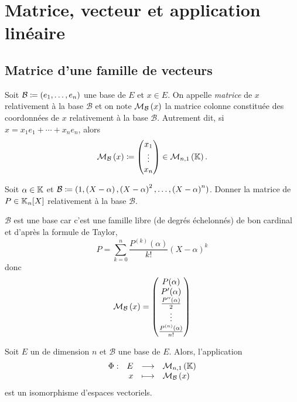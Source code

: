 \documentclass{magnolia}
\begin{document}
\magtoc

\section{Matrice, vecteur et application linéaire}
\subsection{Matrice d'une famille de vecteurs}

\begin{definition}[utile=-3]
Soit $\mathcal{B}\coloneqq(e_1,\ldots,e_n)$ une base de $E$ et $x\in E$.
On appelle \emph{matrice} de $x$ relativement à la base $\mathcal{B}$ et on note
$\mathcal{M}_{\mathcal{B}}\left(x\right)$ la matrice colonne constituée des coordonnées de $x$
relativement à la base $\mathcal{B}$. Autrement dit,
si $x=x_1 e_1+\cdots+x_n e_n$, alors
\[\mathcal{M}_{\mathcal{B}}\left(x\right)\coloneqq
  \begin{pmatrix}
  x_1\\ \vdots\\ x_n
  \end{pmatrix}\in\mathcal{M}_{n,1}\left(\mathbb{K}\right).\]
\end{definition}

\begin{exoUnique}
\exo Soit $\alpha\in\mathbb{K}$ et
  $\mathcal{B}\coloneqq(1,\left(X-\alpha\right),\left(X-\alpha\right)^2,\ldots,\left(X-\alpha\right)^n)$. Donner
  la matrice de $P\in\polyK[n]$ relativement à la base $\mathcal{B}$.
  \begin{sol}
  $\mathcal{B}$ est une base car c'est une famille libre (de degrés échelonnés) de bon cardinal et d'après la formule de Taylor, $$P=\sum_{k=0}^n\frac{P^{(k)}(\alpha)}{k!}(X-\alpha)^k$$ donc \[\mathcal{M}_{\mathcal{B}}\left(x\right)=
  \begin{pmatrix}
  P(\alpha)\\P'(\alpha)\\\frac{P''(\alpha)}{2}\\ \vdots\\ \frac{P^{(n)}(\alpha)}{n!}
  \end{pmatrix}\]
  \end{sol}
\end{exoUnique}

\begin{proposition}[utile=-3]
Soit $E$ un \Kev de dimension $n$ et $\mathcal{B}$ une base de $E$.
Alors, l'application
\[\begin{array}[t]{lrcl} \displaystyle{\Phi} : & \displaystyle{E} & \longrightarrow & \displaystyle{\mathcal{M}_{n,1}\left(\ensuremath{\mathbb{K}}\right)} \\ & \displaystyle{x} & \longmapsto & \displaystyle{\mathcal{M}_{\mathcal{B}}\left(x\right)} \end{array}\]
est un isomorphisme d'espaces vectoriels.
\end{proposition}
\end{document}
